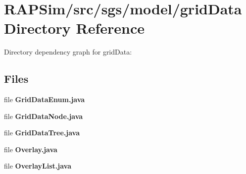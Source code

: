 \section{R\-A\-P\-Sim/src/sgs/model/grid\-Data Directory Reference}
\label{dir_ebbc4f64bf1bebfe7f4bc97dc5a0b4a1}
Directory dependency graph for grid\-Data\-:
\subsection*{Files}
\begin{DoxyCompactItemize}
\item 
file {\bf Grid\-Data\-Enum.\-java}
\item 
file {\bf Grid\-Data\-Node.\-java}
\item 
file {\bf Grid\-Data\-Tree.\-java}
\item 
file {\bf Overlay.\-java}
\item 
file {\bf Overlay\-List.\-java}
\end{DoxyCompactItemize}
